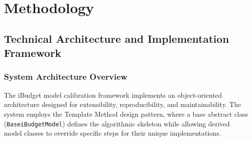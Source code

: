 \chapter{Methodology}







\section{Technical Architecture and Implementation Framework}

\subsection{System Architecture Overview}

The iBudget model calibration framework implements an object-oriented architecture designed for extensibility, reproducibility, and maintainability. The system employs the Template Method design pattern, where a base abstract class (\texttt{BaseiBudgetModel}) defines the algorithmic skeleton while allowing derived model classes to override specific steps for their unique implementations.

